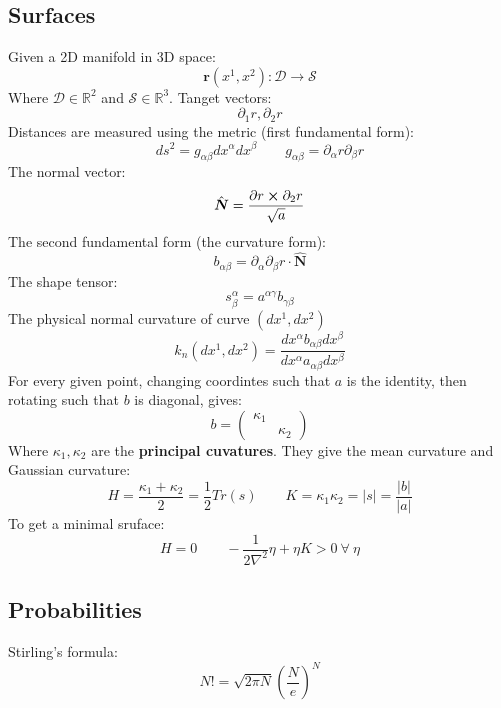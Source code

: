 \documentclass[twocolumn]{article}
\newcommand{\R}{\ensuremath{\mathbb{R}}}
\begin{document}
\subsection{Surfaces}
Given a 2D manifold in 3D space:
\begin{equation}
    \boldsymbol{r}(x^1, x^2): \mathcal{D}\rightarrow\mathcal{S}
\end{equation}
Where $\mathcal{D} \in \R^2$ and $\mathcal{S} \in \R^3$.
\newline
Tanget vectors:
\begin{equation}
    \partial_1 r, \partial_2 r
\end{equation}
Distances are measured using the metric (first fundamental form):
\begin{equation}
    ds^2 = g_{\alpha\beta}dx^\alpha dx^\beta
    \qquad
    g_{\alpha\beta} = \partial_\alpha r \partial_\beta r
\end{equation}
The normal vector:
\begin{equation}
    \hat{\boldsymbol{N}} = \frac{\partial r \cross \partial_2 r}{\sqrt{a}}
\end{equation}
The second fundamental form (the curvature form):
\begin{equation}
    b_{\alpha\beta} = \partial_\alpha \partial_\beta r \cdot \hat{\boldsymbol{N}}
\end{equation}
The shape tensor:
\begin{equation}
    s^\alpha_\beta = a^{\alpha\gamma}b_{\gamma\beta}
\end{equation}
The physical normal curvature of curve $(dx^1, dx^2)$
\begin{equation}
    k_n(dx^1, dx^2) = \frac{dx^\alpha b_{\alpha\beta}dx^\beta}{dx^\alpha a_{\alpha\beta}dx^\beta}
\end{equation}
For every given point, changing coordintes such that $a$ is the identity, then rotating such that $b$ is diagonal, gives:
\begin{equation}
    b = \begin{pmatrix}
        \kappa_1 & \\ & \kappa_2
    \end{pmatrix}
\end{equation}
Where $\kappa_1, \kappa_2$ are the \textbf{principal cuvatures}. They give the mean curvature and Gaussian curvature:
\begin{equation}
    H = \frac{\kappa_1 + \kappa_2}{2} = \frac{1}{2}Tr(s)
    \qquad
    K = \kappa_1\kappa_2 = |s| = \frac{|b|}{|a|}
\end{equation}
To get a minimal sruface:
\begin{equation}
    H = 0
    \qquad
    -\frac{1}{2\nabla^2}\eta + \eta K > 0 \ \forall \ \eta
\end{equation}
\subsection{Probabilities}
Stirling's formula:
\begin{equation}
    N! = \sqrt{2\pi N}\left(\frac{N}{e}\right)^N
\end{equation}
\end{document}

